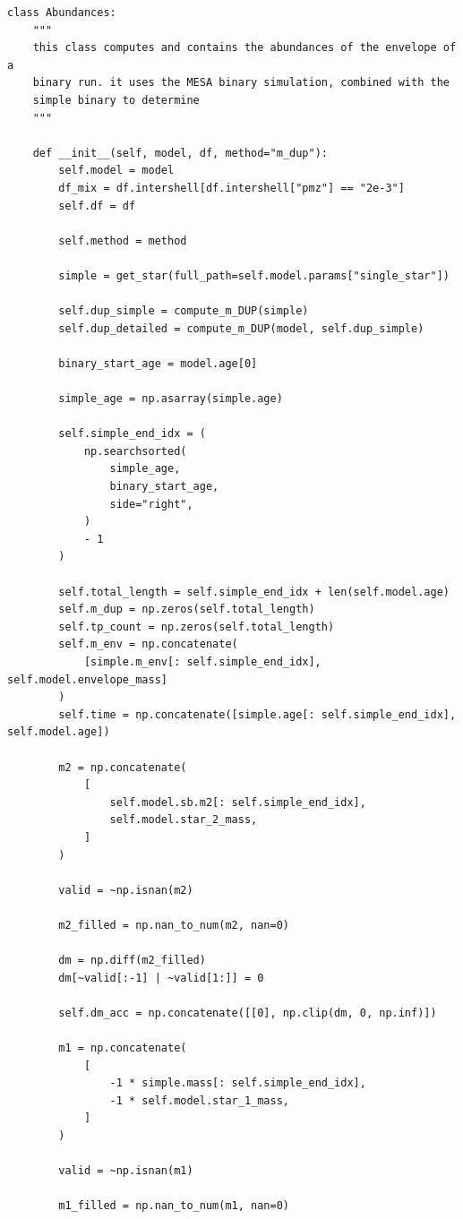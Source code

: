 \documentclass[a4paper,10pt]{article}
\begin{document}
\begin{verbatim}
class Abundances:
    """
    this class computes and contains the abundances of the envelope of a
    binary run. it uses the MESA binary simulation, combined with the
    simple binary to determine
    """

    def __init__(self, model, df, method="m_dup"):
        self.model = model
        df_mix = df.intershell[df.intershell["pmz"] == "2e-3"]
        self.df = df

        self.method = method

        simple = get_star(full_path=self.model.params["single_star"])

        self.dup_simple = compute_m_DUP(simple)
        self.dup_detailed = compute_m_DUP(model, self.dup_simple)

        binary_start_age = model.age[0]

        simple_age = np.asarray(simple.age)

        self.simple_end_idx = (
            np.searchsorted(
                simple_age,
                binary_start_age,
                side="right",
            )
            - 1
        )

        self.total_length = self.simple_end_idx + len(self.model.age)
        self.m_dup = np.zeros(self.total_length)
        self.tp_count = np.zeros(self.total_length)
        self.m_env = np.concatenate(
            [simple.m_env[: self.simple_end_idx], self.model.envelope_mass]
        )
        self.time = np.concatenate([simple.age[: self.simple_end_idx], self.model.age])

        m2 = np.concatenate(
            [
                self.model.sb.m2[: self.simple_end_idx],
                self.model.star_2_mass,
            ]
        )

        valid = ~np.isnan(m2)

        m2_filled = np.nan_to_num(m2, nan=0)

        dm = np.diff(m2_filled)
        dm[~valid[:-1] | ~valid[1:]] = 0

        self.dm_acc = np.concatenate([[0], np.clip(dm, 0, np.inf)])

        m1 = np.concatenate(
            [
                -1 * simple.mass[: self.simple_end_idx],
                -1 * self.model.star_1_mass,
            ]
        )

        valid = ~np.isnan(m1)

        m1_filled = np.nan_to_num(m1, nan=0)


\end{verbatim}
\end{document}
